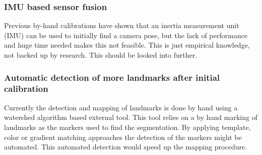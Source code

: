 \subsubsection{IMU based sensor fusion}
Previous by-hand calibrations have shown that an inertia measurement unit (IMU) can be used to initially find a camera pose, but the lack of performance and huge time needed makes this not feasible.
This is just empirical knowledge, not backed up by research. 
This should be looked into further.


\subsubsection{Automatic detection of more landmarks after initial calibration}
\label{sec:auto_detection_landmarks}
Currently the detection and mapping of landmarks is done by hand using a watershed algorithm \cite{meyer1992color,opencv_library} based external tool.
This tool relies on a by hand marking of landmarks as the markers used to find the segmentation.
By applying template, color or gradient matching approaches the detection of the markers might be automated.
This automated detection would speed up the mapping procedure. 

